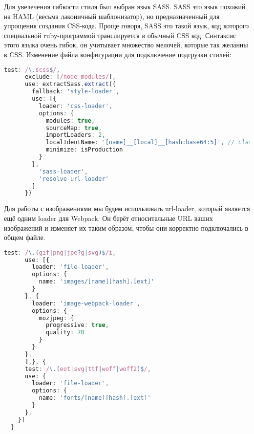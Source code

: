 Для увелечения гибкости стиля был выбран язык SASS\cite{sass}\cite{sass2}\cite{sass3}. SASS это язык похожий на HAML (весьма лаконичный шаблонизатор), но предназначенный 
для упрощения создания CSS-кода. Проще говоря, SASS это такой язык, код которого специальной ruby-программой транслируется в обычный CSS код. Синтаксис этого языка очень гибок, 
он учитывает множество мелочей, которые так желанны в CSS. 
Изменение файла конфигурации для подключение подгрузки стилей:

\begin{lstlisting}[language=TypeScript, label=lst:domain:html]
test: /\.scss$/,
      exclude: [/node_modules/],
      use: extractSass.extract({
        fallback: 'style-loader',
        use: [{
          loader: 'css-loader',
          options: {
            modules: true,
            sourceMap: true,
            importLoaders: 2,
            localIdentName: '[name]__[local]__[hash:base64:5]', // className template
            minimize: isProduction
          }
        },
          'sass-loader',
          'resolve-url-loader'
        ]
      })
\end{lstlisting}

Для работы с изображениями мы будем использовать url-loader, который является ещё одним loader для Webpack. Он берёт относительные URL 
ваших изображений и изменяет их таким образом, чтобы они корректно подключались в общем файле.
\begin{lstlisting}[language=TypeScript, label=lst:domain:html]
test: /\.(gif|png|jpe?g|svg)$/i,
      use: [{
        loader: 'file-loader',
        options: {
          name: 'images/[name][hash].[ext]'
        }
      }, {
        loader: 'image-webpack-loader',
        options: {
          mozjpeg: {
            progressive: true,
            quality: 70
          }
        }
      },
      ],}, {
      test: /\.(eot|svg|ttf|woff|woff2)$/,
      use: {
        loader: 'file-loader',
        options: {
          name: 'fonts/[name][hash].[ext]'
        }
      },
    }]
  }
\end{lstlisting}

